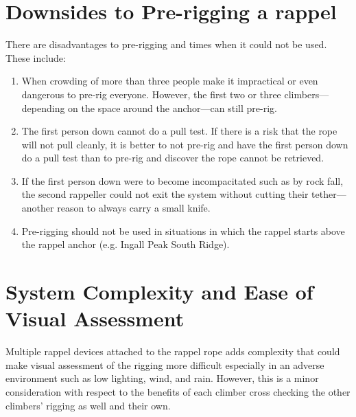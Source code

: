 \documentclass[nonacm,acmtog,authordraft]{acmart}
\begin{document}
\section{Downsides to Pre-rigging a rappel}

  There are disadvantages to pre-rigging and times when it could not be used.
  These include:

  \begin{enumerate}
  \item When crowding of more than three people make it impractical or even
    dangerous to pre-rig everyone.  However, the first two or three
    climbers---depending on the space around the anchor---can still pre-rig.
  \item The first person down cannot do a pull test.  If there is a risk that
    the rope will not pull cleanly, it is better to not pre-rig and have the
    first person down do a pull test than to pre-rig and discover the rope
    cannot be retrieved.
  \item If the first person down were to become incompacitated such as by rock
    fall, the second rappeller could not exit the system without cutting their
    tether---another reason to always carry a small knife. 
  \item Pre-rigging should not be used in situations in which the rappel starts
    above the rappel anchor (e.g. Ingall Peak South Ridge).
  \end{enumerate}


\section{System Complexity and Ease of Visual Assessment}

  Multiple rappel devices attached to the rappel rope adds complexity that
  could make visual assessment of the rigging more difficult especially in an
  adverse environment such as low lighting, wind, and rain.  However, this is a
  minor consideration with respect to the benefits of each climber cross
  checking the other climbers' rigging as well and their own.

\end{document}
